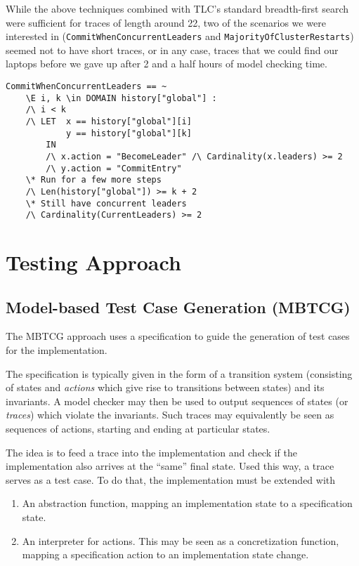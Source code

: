 \documentclass[a4paper]{article}
\begin{document}
While the above techniques combined with TLC's standard breadth-first search were sufficient for traces of length around 22, two of the scenarios we were interested in (\texttt{CommitWhenConcurrentLeaders} and \texttt{MajorityOfClusterRestarts}) seemed not to have short traces, or in any case, traces that we could find our laptops before we gave up after 2 and a half hours of model checking time.

\begin{verbatim}
CommitWhenConcurrentLeaders == ~
    \E i, k \in DOMAIN history["global"] :
    /\ i < k
    /\ LET  x == history["global"][i]
            y == history["global"][k]
        IN
        /\ x.action = "BecomeLeader" /\ Cardinality(x.leaders) >= 2
        /\ y.action = "CommitEntry"
    \* Run for a few more steps
    /\ Len(history["global"]) >= k + 2
    \* Still have concurrent leaders
    /\ Cardinality(CurrentLeaders) >= 2
\end{verbatim}


\section{Testing Approach}

\subsection{Model-based Test Case Generation (MBTCG)}
\label{sec: interpreter}

The MBTCG approach uses a specification to guide the generation of test cases for the implementation.

The specification is typically given in the form of a transition system (consisting of states and \emph{actions} which give rise to transitions between states) and its invariants.
%
A model checker may then be used to output sequences of states (or \emph{traces}) which violate the invariants.
%
Such traces may equivalently be seen as sequences of actions, starting and ending at particular states.

The idea is to feed a trace into the implementation and check if the implementation also arrives at the ``same'' final state. Used this way, a trace serves as a test case.
%
To do that, the implementation must be extended with

\begin{enumerate}
    \item An abstraction function, mapping an implementation state to a specification state.

    \item An interpreter for actions. This may be seen as a concretization function, mapping a specification action to an implementation state change.
\end{enumerate}
\end{document}
